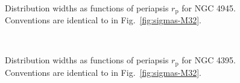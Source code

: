 \documentclass[useAMS,usedcolumn,usegraphicx,usenatbib]{mn2e}
\newcommand{\figref}[1]{Fig.~\ref{fig:#1}}
\newcommand{\sub}[1]{\ensuremath{_\mathrm{#1}}}
\begin{document}
\begin{figure}
\begin{center}
 \quad
{} \\
\caption{Distribution widths as functions of periapsis $r\sub{p}$ for NGC 4945. Conventions are identical to in \figref{sigmas-M32}.\label{fig:sigmas-N4945}}
\end{center}
\end{figure}
\begin{figure}
\begin{center}
 \quad
{} \\
\caption{Distribution widths as functions of periapsis $r\sub{p}$ for NGC 4395. Conventions are identical to in \figref{sigmas-M32}.\label{fig:sigmas-N4395}}
\end{center}
\end{figure}
\end{document}
